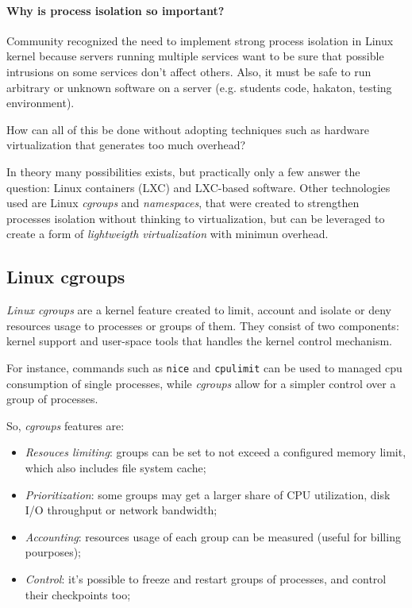\paragraph{Why is process isolation so important?}
Community recognized the need to implement strong process isolation in Linux
kernel because servers running multiple services want to be sure that possible
intrusions on some services don't affect others. Also, it must be safe to run
arbitrary or unknown software on a server (e.g. students code, hakaton, testing
environment).

\bigskip\noindent
How can all of this be done without adopting techniques such as hardware
virtualization that generates too much overhead?

In theory many possibilities exists, but practically only a few answer the
question: Linux containers (LXC) and LXC-based software. Other technologies
used are Linux \emph{cgroups} and \emph{namespaces}, that were created to
strengthen processes isolation without thinking to virtualization, but can be
leveraged to create a form of \emph{lightweigth virtualization} with minimun
overhead.

\subsection{Linux cgroups}
\emph{Linux cgroups} are a kernel feature created to limit, account and isolate
or deny resources usage to processes or groups of them. They consist of two
components: kernel support and user-space tools that handles the kernel control
mechanism.

For instance, commands such as \texttt{nice} and \texttt{cpulimit} can be used
to managed cpu consumption of single processes, while \emph{cgroups} allow for
a simpler control over a group of processes.

So, \emph{cgroups} features are:
\begin{itemize}
    \item \emph{Resouces limiting}: groups can be set to not exceed a configured
    memory limit, which also includes file system cache;
    \item \emph{Prioritization}: some groups may get a larger share of CPU
    utilization, disk I/O throughput or network bandwidth;
    \item \emph{Accounting}: resources usage of each group can be measured
    (useful for billing pourposes);
    \item \emph{Control}: it's possible to freeze and restart groups of
    processes, and control their checkpoints too;
\end{itemize}

